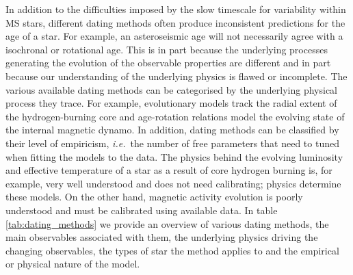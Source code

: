 \documentclass[useAMS, usenatbib, preprint, 12pt]{aastex}
\newcommand{\ie}{{\it i.e.}}
\begin{document}
In addition to the difficulties imposed by the slow timescale for variability
within MS stars, different dating methods often produce inconsistent
predictions for the age of a star.
For example, an asteroseismic age will not necessarily agree with a isochronal
or rotational age.
This is in part because the underlying processes generating the evolution of
the observable properties are different and in part because our understanding
of the underlying physics is flawed or incomplete.
The various available dating methods can be categorised by the underlying
physical process they trace.
For example, evolutionary models track the radial extent of the
hydrogen-burning core and age-rotation relations model the evolving state of
the internal magnetic dynamo.
In addition, dating methods can be classified by their level of empiricism,
\ie\ the number of free parameters that need to tuned when fitting the models
to the data.
The physics behind the evolving luminosity and effective temperature of a star
as a result of core hydrogen burning is, for example, very well understood and
does not need calibrating; physics determine these models.
On the other hand, magnetic activity evolution is poorly understood and must
be calibrated using available data.
In table \ref{tab:dating_methods} we provide an overview of various dating
methods, the main observables associated with them, the underlying physics
driving the changing observables, the types of star the method applies to and
the empirical or physical nature of the model.
\end{document}
